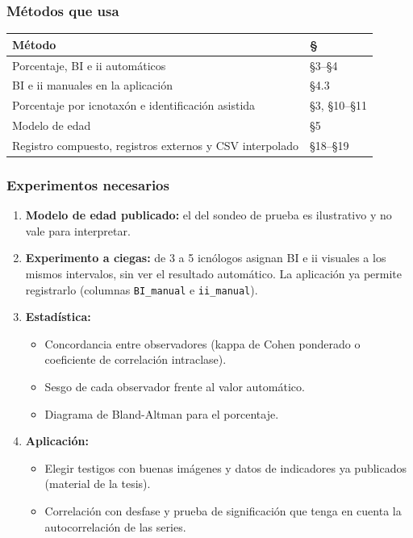 \documentclass[
  10pt,
]{article}
\providecommand{\tightlist}{%
  \setlength{\itemsep}{0pt}\setlength{\parskip}{0pt}}
\begin{document}
\hypertarget{muxe9todos-que-usa-2}{%
\subsubsection{Métodos que usa}\label{muxe9todos-que-usa-2}}

\begin{longtable}[]{@{}ll@{}}
\toprule\noalign{}
Método & § \\
\midrule\noalign{}
\endhead
\bottomrule\noalign{}
\endlastfoot
Porcentaje, BI e ii automáticos & §3--§4 \\
BI e ii manuales en la aplicación & §4.3 \\
Porcentaje por icnotaxón e identificación asistida & §3, §10--§11 \\
Modelo de edad & §5 \\
Registro compuesto, registros externos y CSV interpolado & §18--§19 \\
\end{longtable}

\hypertarget{experimentos-necesarios-1}{%
\subsubsection{Experimentos
necesarios}\label{experimentos-necesarios-1}}

\begin{enumerate}
\def\labelenumi{\arabic{enumi}.}
\setcounter{enumi}{-1}
\tightlist
\item
  \textbf{Modelo de edad publicado:} el del sondeo de prueba es
  ilustrativo y no vale para interpretar.
\item
  \textbf{Experimento a ciegas:} de 3 a 5 icnólogos asignan BI e ii
  visuales a los mismos intervalos, sin ver el resultado automático. La
  aplicación ya permite registrarlo (columnas \texttt{BI\_manual} e
  \texttt{ii\_manual}).
\item
  \textbf{Estadística:}

  \begin{itemize}
  \tightlist
  \item
    Concordancia entre observadores (kappa de Cohen ponderado o
    coeficiente de correlación intraclase).
  \item
    Sesgo de cada observador frente al valor automático.
  \item
    Diagrama de Bland-Altman para el porcentaje.
  \end{itemize}
\item
  \textbf{Aplicación:}

  \begin{itemize}
  \tightlist
  \item
    Elegir testigos con buenas imágenes y datos de indicadores ya
    publicados (material de la tesis).
  \item
    Correlación con desfase y prueba de significación que tenga en
    cuenta la autocorrelación de las series.
  \end{itemize}
\end{enumerate}
\end{document}
